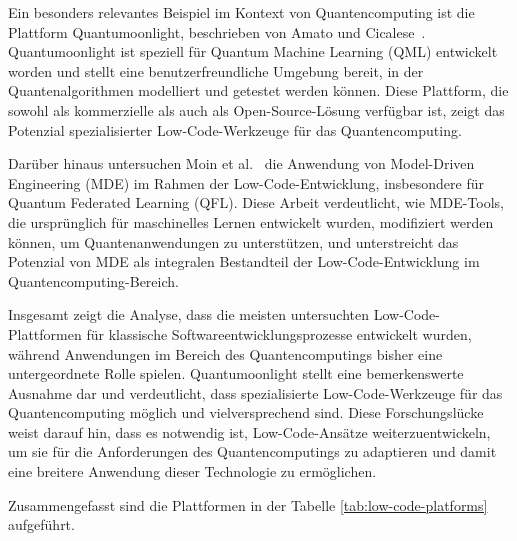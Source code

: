 Ein besonders relevantes Beispiel im Kontext von Quantencomputing ist die Plattform Quantumoonlight, beschrieben von Amato und 
Cicalese~\cite{Amato_2023}. Quantumoonlight ist speziell für Quantum Machine Learning (QML) entwickelt worden 
und stellt eine benutzerfreundliche Umgebung bereit, in der Quantenalgorithmen modelliert und getestet werden können. Diese 
Plattform, die sowohl als kommerzielle als auch als Open-Source-Lösung verfügbar ist, zeigt das Potenzial spezialisierter 
Low-Code-Werkzeuge für das Quantencomputing.

Darüber hinaus untersuchen Moin et al.~\cite{Moin_2023} die Anwendung von Model-Driven Engineering (MDE) im Rahmen der 
Low-Code-Entwicklung, insbesondere für Quantum Federated Learning (QFL). Diese Arbeit verdeutlicht, wie MDE-Tools, die 
ursprünglich für maschinelles Lernen entwickelt wurden, modifiziert werden können, um Quantenanwendungen zu unterstützen, und 
unterstreicht das Potenzial von MDE als integralen Bestandteil der Low-Code-Entwicklung im Quantencomputing-Bereich.

Insgesamt zeigt die Analyse, dass die meisten untersuchten Low-Code-Plattformen für klassische Softwareentwicklungsprozesse 
entwickelt wurden, während Anwendungen im Bereich des Quantencomputings bisher eine untergeordnete Rolle spielen. Quantumoonlight 
stellt eine bemerkenswerte Ausnahme dar und verdeutlicht, dass spezialisierte Low-Code-Werkzeuge für das Quantencomputing möglich 
und vielversprechend sind. Diese Forschungslücke weist darauf hin, dass es notwendig ist, Low-Code-Ansätze weiterzuentwickeln, um 
sie für die Anforderungen des Quantencomputings zu adaptieren und damit eine breitere Anwendung dieser Technologie zu ermöglichen.

Zusammengefasst sind die Plattformen in der Tabelle \ref{tab:low-code-platforms} aufgeführt.

